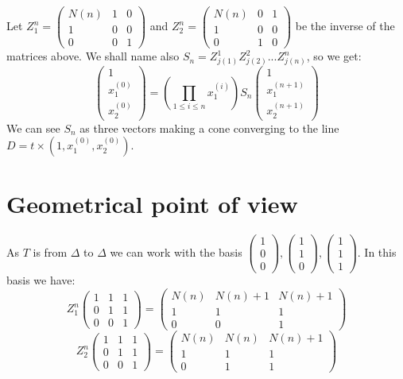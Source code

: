 \documentclass[12pt]{article}
\theoremstyle{plain}%
\theoremstyle{definition}
\theoremstyle{remark}
\begin{document}
Let $Z_1^n=\begin{pmatrix} N(n) & 1 & 0 \\1 & 0 & 0 \\0 & 0 & 1 \end{pmatrix}$ and $Z_2^n=\begin{pmatrix} N(n) & 0 & 1 \\1 & 0 & 0 \\0 & 1 & 0 \end{pmatrix}$ be the inverse of the matrices above. We shall name also $S_n=Z_{j(1)}^1 Z_{j(2)}^2 ... Z_{j(n)}^n$, so we get:\[
\begin{pmatrix} 1 \\ x_1^{(0)} \\ x_2^{(0)} \end{pmatrix} = (\prod_{1 \leq i \leq n} x_1^{(i)})S_n \begin{pmatrix} 1 \\ x_1^{(n+1)} \\ x_2^{(n+1)} \end{pmatrix}
\]
We can see $S_n$ as three vectors making a cone converging to the line $D=t \times (1,x_1^{(0)},x_2^{(0)})$. \newline

\section{Geometrical point of view}

As $T$ is from $\Delta$ to $\Delta$ we can work with the basis $\begin{pmatrix} 1 \\ 0 \\ 0 \end{pmatrix},\begin{pmatrix} 1 \\ 1 \\ 0 \end{pmatrix}, \begin{pmatrix} 1 \\ 1 \\ 1 \end{pmatrix}$. In this basis we have: \[
Z_1^n \begin{pmatrix} 1 & 1 & 1 \\ 0 & 1 & 1 \\ 0 & 0 & 1 \end{pmatrix}=
\begin{pmatrix} N(n) & N(n)+1 & N(n)+1 \\ 1 & 1 & 1 \\ 0 & 0 & 1 \end{pmatrix}
\]
\[
Z_2^n \begin{pmatrix} 1 & 1 & 1 \\ 0 & 1 & 1 \\ 0 & 0 & 1 \end{pmatrix}=
\begin{pmatrix} N(n) & N(n) & N(n)+1 \\ 1 & 1 & 1 \\ 0 & 1 & 1 \end{pmatrix}
\]
\end{document}
